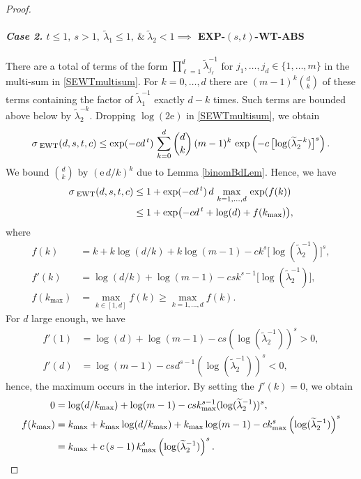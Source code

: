 \documentclass[graybox]{svmult}
\newcommand{\tlambda}{\widetilde{\lambda}}
\newcommand{\me}{\mathrm{e}}
\newcommand{\SEWT}{\sigma_{\;\textup{EWT}}}
\newcommand{\EXP}{\textup{EXP}\xspace}
\newcommand{\ABS}{\textup{ABS}\xspace}
\newcommand{\WT}{\textup{WT}\xspace}
\newcommand{\pk}[1]{{\color{blue}{#1}}}
\begin{document}
\begin{proof}
\paragraph{\textit{Case 2.} $t\le 1, \ s > 1,  \ \tlambda_1 \le 1, \ \& \ \tlambda_2< 1 \implies$ \EXP-$(s,t)$-\WT-\ABS} \label{Case111g} 

There are a total of \pk{$m^d$} terms of the form $\prod_{\ell = 1}^d \tlambda_{j_\ell}^{-1}$ for $j_1, \ldots, j_d \in \{1, \ldots, m\}$ 
in the multi-sum in \eqref{SEWTmultisum}.  For $k = 0, \ldots, d$ there are $(m-1)^k\binom{d}{k}$ 
of these terms containing the factor of $\tlambda_1^{-1}$ exactly $d-k$ times.  
Such terms are bounded above below by $\tlambda_2^{-k}$. Dropping $\log(2\me)$ in \eqref{SEWTmultisum}, we obtain
$$
\SEWT(d,s,t,c ) \le \exp(-cd^{\,t})\,\sum_{k=0}^d\binom{d}{k}
\,(m-1)^k\,\exp\left(-c\,\bigl[\log(\tlambda_{2}^{-k})\bigr]^s\right).
$$
We bound
$\binom{d}{k}$ by $(\me\, d/k)^k$ due to Lemma \ref{binomBdLem}. Hence, we have
\begin{align*}
\SEWT(d,s,t,c) & \le 1 + \exp(-cd^{\,t})\,  d\,
\max_{k=1,\dots,d}\,\exp(f(k)) \\
& \le 1 +  \exp\bigl(-cd^{\,t} + \log(d) + f(k_{\max})\bigr),
\end{align*}
where
\begin{align*}
f(k)&=k+k\log(d/k)+k\log(m-1)-ck^s\bigl[\log(\tlambda_2^{-1})\bigr]^s, \\
f'(k)&= \log(d/k)+ \log(m-1)- c s k^{s-1}\bigl[\log(\tlambda_2^{-1})\bigr] , \\
f(k_{\max})& = \max_{k\in[1,d]}f(k)  \ge \max_{k=1,\dots,d}f(k).
\end{align*}
For $d$ large enough, we have
\begin{align*}
f'(1)&= \log(d) +\log(m-1)- c s(\log(\tlambda_2^{-1}))^s > 0,\\
f'(d)&= \log(m-1)-c s d^{s-1}(\log(\tlambda_2^{-1}))^s < 0,
\end{align*}
hence,
the maximum occurs in the interior.  By setting the $f'(k)=0$, we obtain
\begin{align*}
0  & = \log(d/k_{\rm max}) + \log(m-1)-
csk_{\rm max}^{s-1}(\log(\tlambda_2^{-1}))^s, \\
f(k_{\rm max})&=k_{\rm max}+k_{\rm max}\log(d/k_{\rm max})
+k_{\rm max}\log(m-1)-ck_{\rm
        max}^{s}\left(\log(\tlambda_2^{-1})\right)^s\\
&= k_{\rm max}+c\,(s-1)\,k_{\rm
        max}^{s}\left(\log(\tlambda_2^{-1})\right)^s.
\end{align*}


\end{proof}
\end{document}
